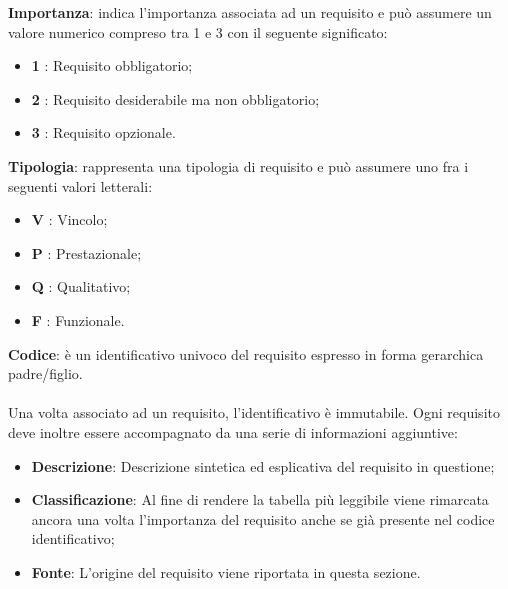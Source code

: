         \textbf{Importanza}: indica l'importanza associata ad un requisito e può assumere un valore numerico compreso tra 1 e 3 con il seguente significato:
            \begin{itemize}[label={}]
                \item \textbf{1} : Requisito obbligatorio;
                \item \textbf{2} : Requisito desiderabile ma non obbligatorio;
                \item \textbf{3} : Requisito opzionale.
            \end{itemize}

        \textbf{Tipologia}: rappresenta una tipologia di requisito e può assumere uno fra i seguenti valori letterali:
        \begin{itemize}[label={}]
            \item \textbf{V} : Vincolo;
            \item \textbf{P} : Prestazionale;
            \item \textbf{Q} : Qualitativo;
            \item \textbf{F} : Funzionale.
        \end{itemize}

        \textbf{Codice}: è un identificativo univoco del requisito espresso in forma gerarchica padre/figlio.
        \\
        \\
        Una volta associato ad un requisito, l'identificativo è immutabile.
        Ogni requisito deve inoltre essere accompagnato da una serie di informazioni aggiuntive:
        \begin{itemize}
            \item \textbf{Descrizione}: Descrizione sintetica ed esplicativa del requisito in questione;
            \item \textbf{Classificazione}: Al fine di rendere la tabella più leggibile viene rimarcata ancora una volta l'importanza del requisito anche se già presente nel codice identificativo;
            \item \textbf{Fonte}: L'origine del requisito viene riportata in questa sezione.
        \end{itemize}

